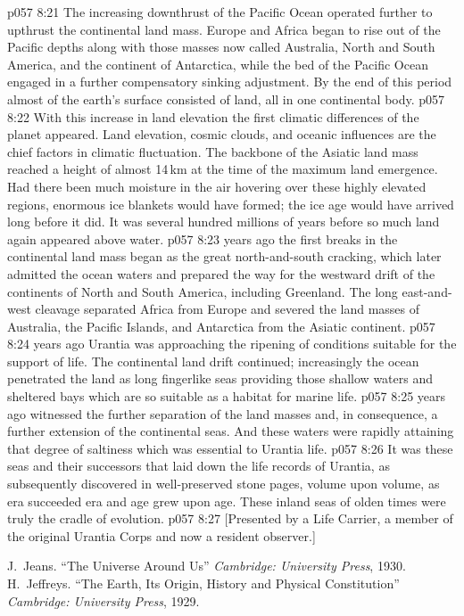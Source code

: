 \vs p057 8:21 The increasing downthrust of the Pacific Ocean operated further to upthrust the continental land mass. Europe and Africa began to rise out of the Pacific depths along with those masses now called Australia, North and South America, and the continent of Antarctica, while the bed of the Pacific Ocean engaged in a further compensatory sinking adjustment. By the end of this period almost  of the earth’s surface consisted of land, all in one continental body.
\vs p057 8:22 With this increase in land elevation the first climatic differences of the planet appeared. Land elevation, cosmic clouds, and oceanic influences are the chief factors in climatic fluctuation. The backbone of the Asiatic land mass reached a height of almost 14\,km at the time of the maximum land emergence. Had there been much moisture in the air hovering over these highly elevated regions, enormous ice blankets would have formed; the ice age would have arrived long before it did. It was several hundred millions of years before so much land again appeared above water.
\vs p057 8:23 \pc {} years ago the first breaks in the continental land mass began as the great north\hyp{}and\hyp{}south cracking, which later admitted the ocean waters and prepared the way for the westward drift of the continents of North and South America, including Greenland. The long east\hyp{}and\hyp{}west cleavage separated Africa from Europe and severed the land masses of Australia, the Pacific Islands, and Antarctica from the Asiatic continent.
\vs p057 8:24 \pc {} years ago Urantia was approaching the ripening of conditions suitable for the support of life. The continental land drift continued; increasingly the ocean penetrated the land as long fingerlike seas providing those shallow waters and sheltered bays which are so suitable as a habitat for marine life.
\vs p057 8:25 \pc {} years ago witnessed the further separation of the land masses and, in consequence, a further extension of the continental seas. And these waters were rapidly attaining that degree of saltiness which was essential to Urantia life.
\vs p057 8:26 It was these seas and their successors that laid down the life records of Urantia, as subsequently discovered in well\hyp{}preserved stone pages, volume upon volume, as era succeeded era and age grew upon age. These inland seas of olden times were truly the cradle of evolution.
\vsetoff
\vs p057 8:27 [Presented by a Life Carrier, a member of the original Urantia Corps and now a resident observer.]
\quizlink
\begin{thebibliography}{100}
J.~Jeans.
{``The Universe Around Us''}
{\em Cambridge: University Press}, 1930.
H.~Jeffreys.
{``The Earth, Its Origin, History and Physical Constitution''}
{\em Cambridge: University Press}, 1929.
\end{thebibliography}
